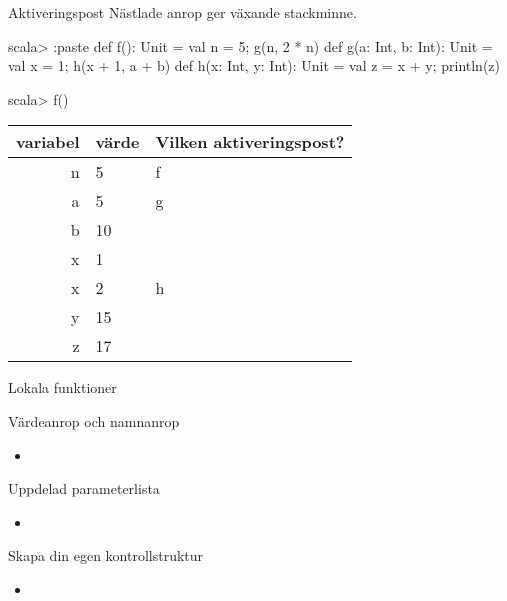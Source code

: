 \begin{Slide}{Aktiveringspost}\SlideFontSmall
Nästlade anrop ger växande stackminne.
\begin{REPL}
scala> :paste
def f(): Unit = { val n = 5; g(n, 2 * n) }
def g(a: Int, b: Int): Unit = { val x = 1; h(x + 1, a + b) }
def h(x: Int, y: Int): Unit = { val z = x + y; println(z) }

scala> f()

\end{REPL}


\begin{tabular}{|r | l | l |} \hline

variabel & värde & Vilken aktiveringspost? \\ \hline \hline
\pause
 n & 5 & f \\ \hline
 \pause 
 a & 5 & g \\
 b & 10 &  \\
 x & 1  &  \\  \hline
 \pause 
 x & 2  & h \\
 y & 15 &  \\
 z & 17 & \\ 
\end{tabular}
\end{Slide} 


\begin{Slide}{Lokala funktioner}
\end{Slide} 



\begin{Slide}{Värdeanrop och namnanrop}
\begin{itemize}
\item 
\end{itemize}
\end{Slide} 



\begin{Slide}{Uppdelad parameterlista}
\begin{itemize}
\item 
\end{itemize}
\end{Slide} 


\begin{Slide}{Skapa din egen kontrollstruktur}
\begin{itemize}
\item 
\end{itemize}
\end{Slide} 


